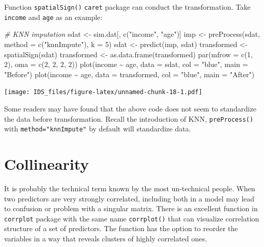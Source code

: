 \documentclass[
  12pt,
]{krantz}
\makeatletter
\newenvironment{Shaded}{\begin{snugshade}}{\end{snugshade}}
\newcommand{\AttributeTok}[1]{\textcolor[rgb]{0.61,0.61,0.61}{#1}}
\newcommand{\CommentTok}[1]{\textcolor[rgb]{0.37,0.37,0.37}{\textit{#1}}}
\newcommand{\DecValTok}[1]{\textcolor[rgb]{0.06,0.06,0.06}{#1}}
\newcommand{\FunctionTok}[1]{\textcolor[rgb]{0,0,0}{#1}}
\newcommand{\NormalTok}[1]{#1}
\newcommand{\OtherTok}[1]{\textcolor[rgb]{0.37,0.37,0.37}{#1}}
\newcommand{\SpecialCharTok}[1]{\textcolor[rgb]{0,0,0}{#1}}
\newcommand{\StringTok}[1]{\textcolor[rgb]{0.5,0.5,0.5}{#1}}
\newenvironment{kframe}{%
\medskip{}
\setlength{\fboxsep}{.8em}
 \def\at@end@of@kframe{}%
 \ifinner\ifhmode%
  \def\at@end@of@kframe{\end{minipage}}%
  \begin{minipage}{\columnwidth}%
 \fi\fi%
 \def\FrameCommand##1{\hskip\@totalleftmargin \hskip-\fboxsep
 \colorbox{shadecolor}{##1}\hskip-\fboxsep
     \hskip-\linewidth \hskip-\@totalleftmargin \hskip\columnwidth}%
 \MakeFramed {\advance\hsize-\width
   \@totalleftmargin\z@ \linewidth\hsize
   \@setminipage}}%
 {\par\unskip\endMakeFramed%
 \at@end@of@kframe}
\renewenvironment{Shaded}{\begin{kframe}}{\end{kframe}}
\makeatother
\begin{document}
Function \texttt{spatialSign()} \texttt{caret} package can conduct the transformation. Take \texttt{income} and \texttt{age} as an example:

\begin{Shaded}
\begin{Highlighting}[]
\CommentTok{\# KNN imputation}
\NormalTok{sdat }\OtherTok{\textless{}{-}}\NormalTok{ sim.dat[, }\FunctionTok{c}\NormalTok{(}\StringTok{"income"}\NormalTok{, }\StringTok{"age"}\NormalTok{)]}
\NormalTok{imp }\OtherTok{\textless{}{-}} \FunctionTok{preProcess}\NormalTok{(sdat, }\AttributeTok{method =} \FunctionTok{c}\NormalTok{(}\StringTok{"knnImpute"}\NormalTok{), }\AttributeTok{k =} \DecValTok{5}\NormalTok{)}
\NormalTok{sdat }\OtherTok{\textless{}{-}} \FunctionTok{predict}\NormalTok{(imp, sdat)}
\NormalTok{transformed }\OtherTok{\textless{}{-}} \FunctionTok{spatialSign}\NormalTok{(sdat)}
\NormalTok{transformed }\OtherTok{\textless{}{-}} \FunctionTok{as.data.frame}\NormalTok{(transformed)}
\FunctionTok{par}\NormalTok{(}\AttributeTok{mfrow =} \FunctionTok{c}\NormalTok{(}\DecValTok{1}\NormalTok{, }\DecValTok{2}\NormalTok{), }\AttributeTok{oma =} \FunctionTok{c}\NormalTok{(}\DecValTok{2}\NormalTok{, }\DecValTok{2}\NormalTok{, }\DecValTok{2}\NormalTok{, }\DecValTok{2}\NormalTok{))}
\FunctionTok{plot}\NormalTok{(income }\SpecialCharTok{\textasciitilde{}}\NormalTok{ age, }\AttributeTok{data =}\NormalTok{ sdat, }\AttributeTok{col =} \StringTok{"blue"}\NormalTok{, }\AttributeTok{main =} \StringTok{"Before"}\NormalTok{)}
\FunctionTok{plot}\NormalTok{(income }\SpecialCharTok{\textasciitilde{}}\NormalTok{ age, }\AttributeTok{data =}\NormalTok{ transformed, }\AttributeTok{col =} \StringTok{"blue"}\NormalTok{, }\AttributeTok{main =} \StringTok{"After"}\NormalTok{)}
\end{Highlighting}
\end{Shaded}

\texttt{[image: IDS\_files/figure-latex/unnamed-chunk-18-1.pdf]}

Some readers may have found that the above code does not seem to standardize the data before transformation. Recall the introduction of KNN, \texttt{preProcess()} with \texttt{method="knnImpute"} by default will standardize data.

\hypertarget{collinearity}{%
\section{Collinearity}\label{collinearity}}

It is probably the technical term known by the most un-technical people. When two predictors are very strongly correlated, including both in a model may lead to confusion or problem with a singular matrix. There is an excellent function in \texttt{corrplot} package with the same name \texttt{corrplot()} that can visualize correlation structure of a set of predictors. The function has the option to reorder the variables in a way that reveals clusters of highly correlated ones.
\end{document}
